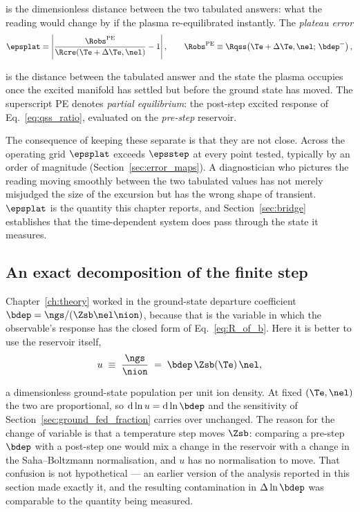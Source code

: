 \noindent is the dimensionless distance between the two tabulated answers: what
the reading would change by if the plasma re-equilibrated instantly. The
\emph{plateau error}
\begin{equation}
  \epsplat = \left|\frac{\Robs^{\rm PE}}
                        {\Rcre(\Te+\Delta\Te,\nel)} - 1\right|,
  \qquad
  \Robs^{\rm PE} \equiv \Rqss\!\left(\Te+\Delta\Te,\nel;\,\bdep^-\right),
  \label{eq:eps_plateau_def}
\end{equation}

\noindent is the distance between the tabulated answer and the state the plasma
occupies once the excited manifold has settled but before the ground state has
moved. The superscript PE denotes \emph{partial equilibrium}: the post-step
excited response of Eq.~\eqref{eq:qss_ratio}, evaluated on the \emph{pre-step}
reservoir.

The consequence of keeping these separate is that they are not close. Across the
operating grid $\epsplat$ exceeds $\epsstep$ at every point tested, typically by
an order of magnitude (Section~\ref{sec:error_maps}). A diagnostician who
pictures the reading moving smoothly between the two tabulated values has not
merely misjudged the size of the excursion but has the wrong shape of transient.
$\epsplat$ is the quantity this chapter reports, and Section~\ref{sec:bridge}
establishes that the time-dependent system does pass through the state it
measures.

\subsection{An exact decomposition of the finite step}
\label{sec:exact_decomposition}

Chapter~\ref{ch:theory} worked in the ground-state departure coefficient
$\bdep = \ngs/(\Zsb\nel\nion)$, because that is the variable in which the
observable's response has the closed form of Eq.~\eqref{eq:R_of_b}. Here it is
better to use the reservoir itself,
\begin{equation}
  u \;\equiv\; \frac{\ngs}{\nion} \;=\; \bdep\,\Zsb(\Te)\,\nel ,
  \label{eq:u_def}
\end{equation}

\noindent a dimensionless ground-state population per unit ion density. At
fixed $(\Te,\nel)$ the two are proportional, so $\mathrm{d}\ln u =
\mathrm{d}\ln\bdep$ and the sensitivity of
Section~\ref{sec:ground_fed_fraction} carries over unchanged. The reason for
the change of variable is that a temperature step moves $\Zsb$: comparing a
pre-step $\bdep$ with a post-step one would mix a change in the reservoir with
a change in the Saha--Boltzmann normalisation, and $u$ has no normalisation to
move. That confusion is not hypothetical --- an earlier version of the analysis
reported in this section made exactly it, and the resulting contamination in
$\Delta\ln\bdep$ was comparable to the quantity being measured.


